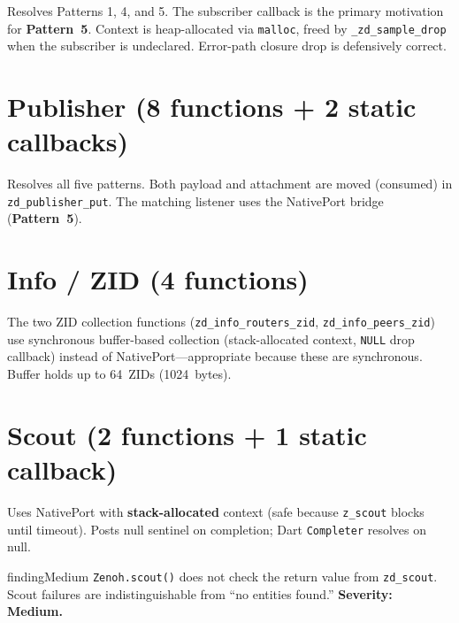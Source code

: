 \documentclass[11pt,a4paper]{article}
\newcommand{\code}[1]{\texttt{#1}}
\newcommand{\fn}[1]{\texttt{#1}}
\newcommand{\pattern}[1]{\textbf{Pattern~#1}}
\begin{document}
Resolves Patterns 1, 4, and 5. The subscriber callback is the primary
motivation for \pattern{5}. Context is heap-allocated via \code{malloc},
freed by \fn{\_zd\_sample\_drop} when the subscriber is undeclared.
Error-path closure drop is defensively correct.


\section{Publisher (8 functions + 2 static callbacks)}

Resolves all five patterns. Both payload and attachment are moved
(consumed) in \fn{zd\_pub\-lisher\_put}. The matching listener uses
the NativePort bridge (\pattern{5}).


\section{Info / ZID (4 functions)}

The two ZID collection functions
(\fn{zd\_info\_routers\_zid}, \fn{zd\_info\_peers\_zid})
use synchronous buffer-based collection (stack-allocated context,
\code{NULL} drop callback) instead of NativePort---appropriate because
these are synchronous. Buffer holds up to 64~ZIDs (1024~bytes).


\section{Scout (2 functions + 1 static callback)}

Uses NativePort with \textbf{stack-allocated} context (safe because
\fn{z\_scout} blocks until timeout). Posts null sentinel on completion;
Dart \code{Completer} resolves on null.

\begin{findingbox}{findingMedium}
\fn{Zenoh.scout()} does not check the return value from \fn{zd\_scout}.
Scout failures are indistinguishable from ``no entities found.''
\textbf{Severity: Medium.}
\end{findingbox}
\end{document}
